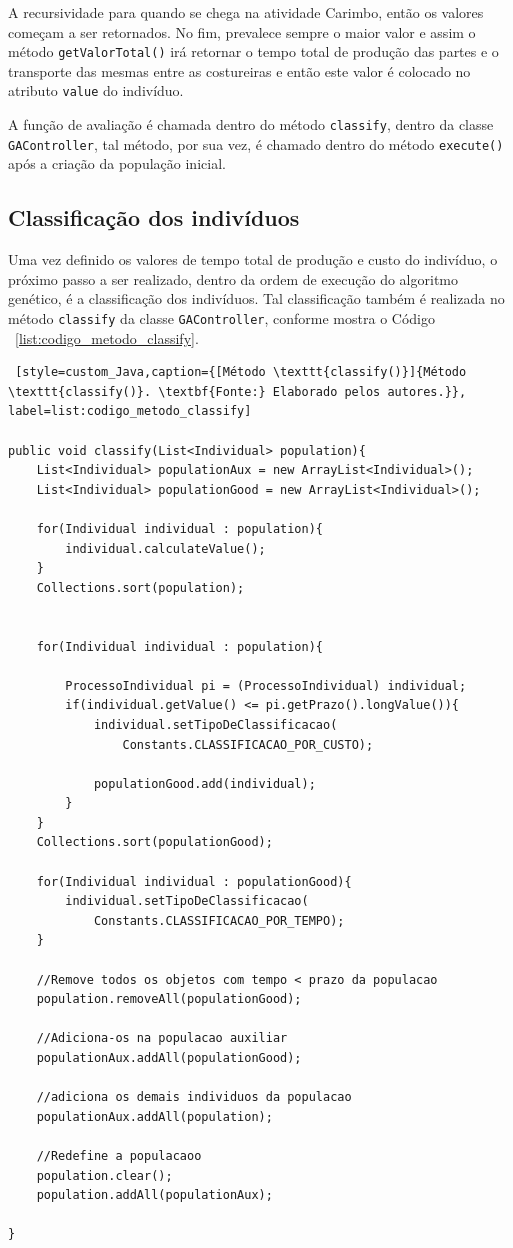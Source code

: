 A recursividade para quando se chega na atividade Carimbo, então os valores começam a ser retornados.  No fim, prevalece sempre o 
maior valor e assim o método \texttt{getValorTotal()} irá retornar o tempo total de produção das partes e o transporte das mesmas 
entre as costureiras e então este valor é colocado no atributo \texttt{value} do indivíduo.

\par A função de avaliação é chamada dentro do método \texttt{classify}, dentro da classe \texttt{GAController}, tal método, 
por sua vez, é chamado dentro do método \texttt{execute()} após a criação da população inicial.

\subsection{Classificação dos indivíduos}
\par Uma vez definido os valores de tempo total de produção e custo do indivíduo, o próximo passo a ser realizado, dentro da
ordem de execução do algoritmo genético, é a classificação dos indivíduos. Tal classificação também é realizada no método 
\texttt{classify} da classe \texttt{GAController}, conforme mostra o Código ~\ref{list:codigo_metodo_classify}.


\begin{lstlisting} [style=custom_Java,caption={[Método \texttt{classify()}]{Método \texttt{classify()}. \textbf{Fonte:} Elaborado pelos autores.}}, label=list:codigo_metodo_classify] 

public void classify(List<Individual> population){
	List<Individual> populationAux = new ArrayList<Individual>();
	List<Individual> populationGood = new ArrayList<Individual>();
	
	for(Individual individual : population){
		individual.calculateValue();
	}
	Collections.sort(population);
		
		
	for(Individual individual : population){
			
		ProcessoIndividual pi = (ProcessoIndividual) individual;
		if(individual.getValue() <= pi.getPrazo().longValue()){
			individual.setTipoDeClassificacao(
				Constants.CLASSIFICACAO_POR_CUSTO);
				
			populationGood.add(individual);
		}
	}
	Collections.sort(populationGood);
				
	for(Individual individual : populationGood){
		individual.setTipoDeClassificacao(
			Constants.CLASSIFICACAO_POR_TEMPO);
	}
					
	//Remove todos os objetos com tempo < prazo da populacao
	population.removeAll(populationGood);
				
	//Adiciona-os na populacao auxiliar
	populationAux.addAll(populationGood);
					
	//adiciona os demais individuos da populacao
	populationAux.addAll(population);
				
	//Redefine a populacaoo
	population.clear();
	population.addAll(populationAux);
					
}
						
\end{lstlisting}


